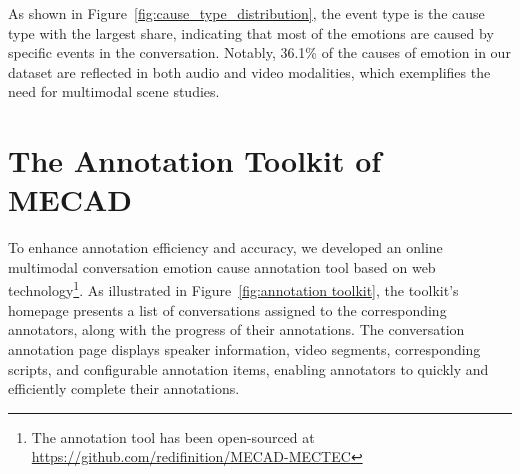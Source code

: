 \documentclass[11pt]{article}
\begin{document}
As shown in Figure~\ref{fig:cause_type_distribution}, the event type is the cause type with the largest share, indicating that most of the emotions are caused by specific events in the conversation.
Notably, 36.1\% of the causes of emotion in our dataset are reflected in both audio and video modalities, which exemplifies the need for multimodal scene studies.

\section{The Annotation Toolkit of MECAD}
\label{Appendix-toolkit}
To enhance annotation efficiency and accuracy, we developed an online multimodal conversation emotion cause annotation tool based on web technology\footnote{The annotation tool has been open-sourced at \url{https://github.com/redifinition/MECAD-MECTEC}}.
As illustrated in Figure~\ref{fig:annotation toolkit}, the toolkit’s homepage presents a list of conversations assigned to the corresponding annotators, along with the progress of their annotations.
The conversation annotation page displays speaker information, video segments, corresponding scripts, and configurable annotation items, enabling annotators to quickly and efficiently complete their annotations.
\end{document}
